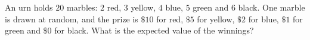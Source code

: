 An urn holds $20$ marbles: $2$ red, $3$ yellow, $4$ blue, $5$ green and $6$ black. One marble is drawn at random, and the prize is $\$10$ for red, $\$5$ for yellow, $\$2$ for blue, $\$1$ for green and $\$0$ for black. What is the expected value of the winnings?
